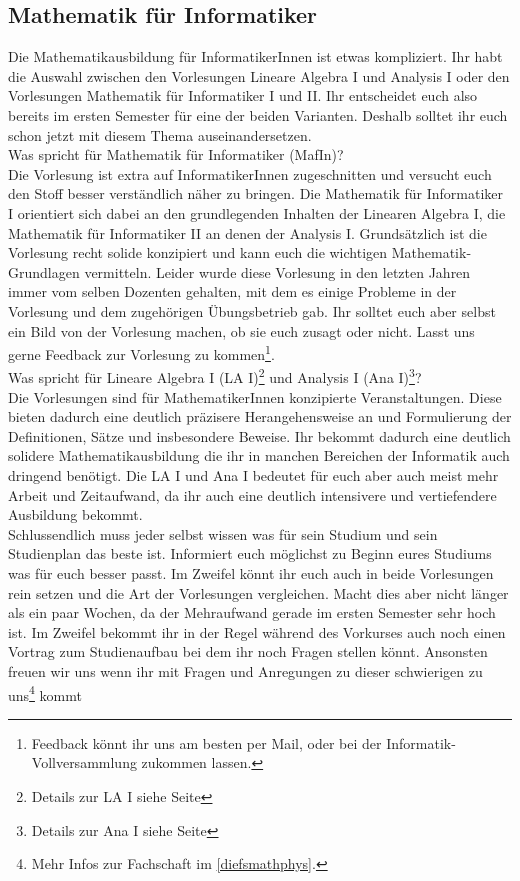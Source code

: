 \subsection{Mathematik für Informatiker}
\label{mafin}

Die Mathematikausbildung für InformatikerInnen ist etwas kompliziert. Ihr habt die Auswahl zwischen den Vorlesungen Lineare Algebra I und Analysis I oder den Vorlesungen Mathematik für Informatiker I und II. Ihr entscheidet euch also bereits im ersten Semester für eine der beiden Varianten. Deshalb solltet ihr euch schon jetzt mit diesem Thema auseinandersetzen.\\

Was spricht für Mathematik für Informatiker (MafIn)?\\
Die Vorlesung ist extra auf InformatikerInnen zugeschnitten und versucht euch den Stoff besser verständlich näher zu bringen. Die Mathematik für Informatiker I orientiert sich dabei an den grundlegenden Inhalten der Linearen Algebra I, die Mathematik für Informatiker II an denen der Analysis I. Grundsätzlich ist die Vorlesung recht solide konzipiert und kann euch die wichtigen Mathematik-Grundlagen vermitteln. Leider wurde diese Vorlesung in den letzten Jahren immer vom selben Dozenten gehalten, mit dem es einige Probleme in der Vorlesung und dem zugehörigen Übungsbetrieb gab. Ihr solltet euch aber selbst ein Bild von der Vorlesung machen, ob sie euch zusagt oder nicht. Lasst uns gerne Feedback zur Vorlesung zu kommen\footnote{Feedback könnt ihr uns am besten per Mail, oder bei der Informatik-Vollversammlung zukommen lassen.}.\\

Was spricht für Lineare Algebra I (LA I)\footnote{Details zur LA I siehe Seite \pageref{la1}} und Analysis I (Ana I)\footnote{Details zur Ana I siehe Seite \pageref{ana1}}?\\
Die Vorlesungen sind für MathematikerInnen konzipierte Veranstaltungen. Diese bieten dadurch eine deutlich präzisere Herangehensweise an und Formulierung der Definitionen, Sätze und insbesondere Beweise. Ihr bekommt dadurch eine deutlich solidere Mathematikausbildung die ihr in manchen Bereichen der Informatik auch dringend benötigt. Die LA I und Ana I bedeutet für euch aber auch meist mehr Arbeit und Zeitaufwand, da ihr auch eine deutlich intensivere und vertiefendere Ausbildung bekommt.\\

Schlussendlich muss jeder selbst wissen was für sein Studium und sein Studienplan das beste ist. Informiert euch möglichst zu Beginn eures Studiums was für euch besser passt. Im Zweifel könnt ihr euch auch in beide Vorlesungen rein setzen und die Art der Vorlesungen vergleichen. Macht dies aber nicht länger als ein paar Wochen, da der Mehraufwand gerade im ersten Semester sehr hoch ist. Im Zweifel bekommt ihr in der Regel während des Vorkurses auch noch einen Vortrag zum Studienaufbau bei dem ihr noch Fragen stellen könnt. Ansonsten freuen wir uns wenn ihr mit Fragen und Anregungen zu dieser schwierigen zu uns\footnote{Mehr Infos zur Fachschaft im \autoref{diefsmathphys}.} kommt
